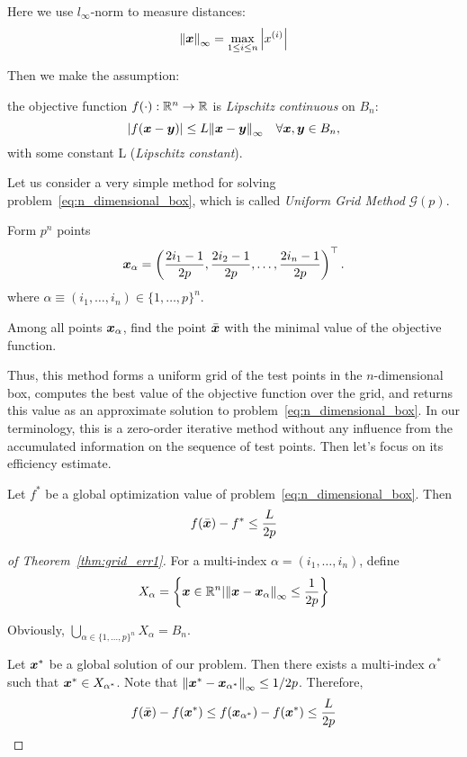 Here we use \(l_\infty\)-norm to measure distances:
\[
    \norm{\bm{x}}_{\infty} = \max_{1 \le i \le n} \abs{x^{(i)}}  
\]

Then we make the assumption:
\begin{assum}\label{assum:lipschitz_objective_func}
    the objective function \(f(\cdot): \mathbb{R}^n \to \mathbb{R}\) is \emph{Lipschitz continuous} on \(B_n\):
    \[
        \abs{f(\bm{x} - \bm{y})} \le L \norm{\bm{x} - \bm{y}}_{\infty} \quad \forall \bm{x},\bm{y} \in B_n,
    \]
    with some constant L (\emph{Lipschitz constant}).
\end{assum}

Let us consider a very simple method for solving problem~\ref{eq:n_dimensional_box}, 
which is called \emph{Uniform Grid Method} \(\mathscr{G}(p)\).
\begin{algorithm}[!htbp]
\caption{Uniform Grid Method \(\mathscr{G}(p)\)}\label{alg:uniform_grid_method}
    Form \(p^n\) points
    \[
        \bm{x}_\alpha = \left( \frac{2i_1 - 1}{2p}, \frac{2i_2 - 1}{2p}, \dots, \frac{2i_n - 1}{2p} \right)^\top.  
    \]
    where \(\alpha \equiv (i_1, \dots, i_n) \in \{1, \dots, p\}^n\).
    
    Among all points \(\bm{x}_\alpha\), find the point \(\bar{\bm{x}}\) with the minimal value of the objective function.
\end{algorithm}

Thus, this method forms a uniform grid of the test points in the \(n\)-dimensional box, 
computes the best value of the objective function over the grid, and returns this value 
as an approximate solution to problem~\ref{eq:n_dimensional_box}. In our terminology, 
this is a zero-order iterative method without any influence from the accumulated information 
on the sequence of test points. Then let's focus on its efficiency estimate.

\begin{thm}\label{thm:grid_err1}
    Let \(f^*\) be a global optimization value of problem~\ref{eq:n_dimensional_box}. Then
    \[
        f(\bar{\bm{x}}) - f^* \le \frac{L}{2p}  
    \]
\end{thm}

\begin{proof}[of Theorem~\ref{thm:grid_err1}]
    For a multi-index \(\alpha = (i_1, \dots, i_n)\), define
    \[
        X_\alpha = \left\{ \bm{x} \in \mathbb{R}^n \arrowvert \norm{\bm{x} - \bm{x}_\alpha}_{\infty} \le \frac{1}{2p} \right\}
    \]

    Obviously, \(\bigcup_{\alpha \in \{1, \dots, p\}^n} X_\alpha = B_n\).

    Let \(\bm{x}^*\) be a global solution of our problem. Then there exists a multi-index \(\alpha^*\) 
    such that \(\bm{x}^* \in X_{\alpha^*}\). Note that \(\norm{\bm{x}^* - \bm{x}_{\alpha^*}}_{\infty} \le 1/2p\). 
    Therefore,
    \[
        f(\bar{\bm{x}}) - f(\bm{x}^*) \le f(\bm{x}_{\alpha^*}) - f(\bm{x}^*) \le \frac{L}{2p}
    \]
\end{proof}

